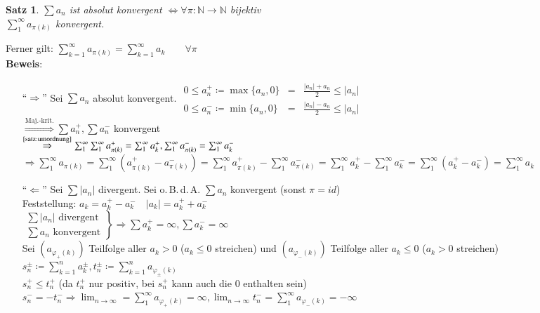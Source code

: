 \documentclass[ngerman,titlepage,twoside, parskip=half*]{scrreprt}
\newcommand*{\N}{\mathbb{N}}
\theoremstyle{plain}
\newtheorem{theorem}{Satz}[section]
\theoremstyle{definition}
\theoremstyle{remark}
\begin{document}
\begin{theorem}
\label{satz:absUmordnung}
$\sum a_n$ ist absolut konvergent $\Leftrightarrow \forall \pi \colon\N \rightarrow \N$ bijektiv\\
$\sum_1^\infty a_{\pi(k)}$ konvergent.
\end{theorem}
Ferner gilt: $\sum_{k=1}^\infty a_{\pi(k)}=\sum_{k=1}^\infty a_k \qquad \forall \pi$\\
\textbf{Beweis}:
\begin{itemize}
  \item["`$\Rightarrow$"'] Sei $\sum a_n$ absolut konvergent.
    $\begin{array}{rcl}
      0\leq a_n^+\coloneqq\max\{a_n,0\} & = & \frac{|a_n|+a_n}{2}\leq |a_n|\\
      0\leq a_n^-\coloneqq\min\{a_n,0\} & = & \frac{|a_n|-a_n}{2}\leq |a_n|
    \end{array}$\\
    $\stackrel{\text{Maj.-krit.}}{\Rightarrow} \sum a_n^+, \sum a_n^-$ konvergent\\
    $\stackrel{\text{\autoref{satz:umordnung}}}{\Rightarrow} \sum_1^\infty \sum_1^\infty a_{\pi(k)}^+=\sum_1^\infty a_k^+,
    \sum_1^\infty a_{\pi(k)}^-=\sum_1^\infty a_k^-$\\
    $\Rightarrow \sum_1^\infty a_{\pi(k)}=\sum_1^\infty (a_{\pi(k)}^+-a_{\pi(k)}^-)=\sum_1^\infty a_{\pi(k)}^+-
    \sum_1^\infty a_{\pi(k)}^- =\sum_1^\infty a_k^+ -\sum_1^\infty a_k^-
  =\sum_1^\infty (a_k^+ -a_k^-)=\sum_1^\infty a_k$
  \item["`$\Leftarrow$"'] Sei $\sum |a_n|$ divergent. Sei o.\,B.\,d.\,A. $\sum a_n$ konvergent (sonst $\pi=id$)\\
    Feststellung: $a_k=a_k^+-a_k^- \quad |a_k|=a_k^++a_k^-$\\
    $\left.\begin{array}{rcl}
      \sum |a_n| \text{ divergent}\\
      \sum a_n \text{ konvergent}
    \end{array}\right\}\Rightarrow \sum a_k^+=\infty, \sum a_k^-=\infty$\\
    Sei $(a_{\varphi_+(k)})$ Teilfolge aller $a_k>0$ ($a_k\leq 0$ streichen) und $(a_{\varphi_-(k)})$ Teilfolge aller
    $a_k\leq 0$ ($a_k>0$ streichen)\\
    $s_n^\pm\coloneqq\sum_{k=1}^n a_k^\pm, t_n^\pm\coloneqq\sum_{k=1}^n
  a_{\varphi_\pm(k)}$\\
    $s_n^+\leq t_n^+$ (da $t_n^+$ nur positiv, bei $s_n^+$ kann auch die 0 enthalten sein)\\
    $s_n^-=-t_n^- \Rightarrow \lim_{n\rightarrow \infty}=\sum_1^\infty a_{\varphi_+(k)}=\infty, \lim_{n\rightarrow \infty}
    t_n^-=\sum_1^\infty a_{\varphi_-(k)}=-\infty$ %
\end{itemize}
\end{document}
